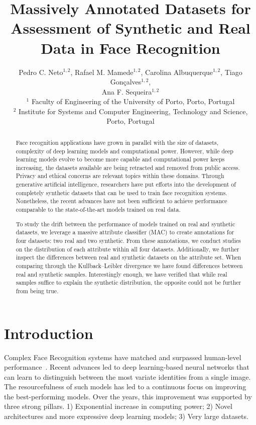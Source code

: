 \documentclass[a4paper, 10pt, conference]{ieeeconf}      %
\title{Massively Annotated Datasets for Assessment of Synthetic and Real Data in Face Recognition}
\author{\parbox{16cm}{\centering
    {\large  Pedro C. Neto$^{1,2}$, Rafael M. Mamede$^{1,2}$, Carolina Albuquerque$^{1,2}$, Tiago Gonçalves$^{1,2}$,  \\Ana F. Sequeira$^{1,2}$}\\
   {\normalsize
    $^1$ Faculty of Engineering of the University of Porto, Porto, Portugal\\
    $^2$ Institute for Systems and Computer Engineering, Technology and Science, Porto, Portugal}}%
}
\begin{document}
\thispagestyle{empty}
\pagestyle{empty}
\maketitle

\begin{abstract}

Face recognition applications have grown in parallel with the size of datasets, complexity of deep learning models and computational power. However, while deep learning models evolve to become more capable and computational power keeps increasing, the datasets available are being retracted and removed from public access. Privacy and ethical concerns are relevant topics within these domains. Through generative artificial intelligence, researchers have put efforts into the development of completely synthetic datasets that can be used to train face recognition systems. Nonetheless, the recent advances have not been sufficient to achieve performance comparable to the state-of-the-art models trained on real data. 

To study the drift between the performance of models trained on real and synthetic datasets, we leverage a massive attribute classifier (MAC) to create annotations for four datasets: two real and two synthetic. From these annotations, we conduct studies on the distribution of each attribute within all four datasets. Additionally, we further inspect the differences between real and synthetic datasets on the attribute set.  When comparing through the Kullback–Leibler divergence we have found differences between real and synthetic samples. Interestingly enough, we have verified that while real samples suffice to explain the synthetic distribution, the opposite could not be further from being true. 
\end{abstract}


\section{Introduction}

Complex Face Recognition systems have matched and surpassed human-level performance~\cite{taigman2014deepface}. Recent advances led to deep learning-based neural networks that can learn to distinguish between the most variate identities from a single image. The resourcefulness of such models has led to a continuous focus on improving the best-performing models. Over the years, this improvement was supported by three strong pillars. 1) Exponential increase in computing power; 2) Novel architectures and more expressive deep learning models; 3) Very large datasets.  
\end{document}
